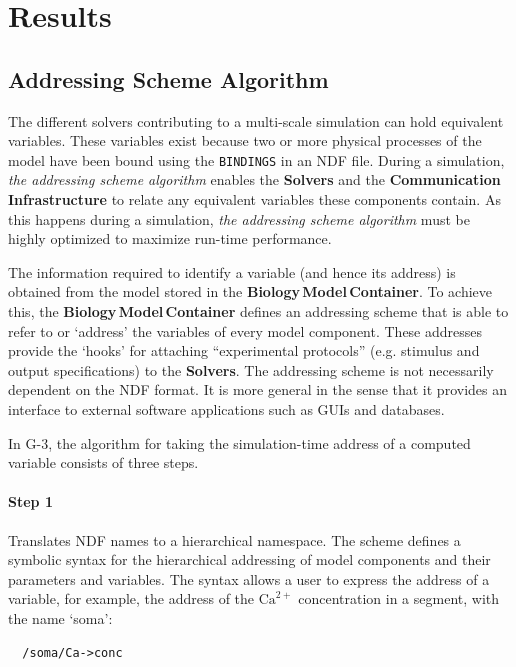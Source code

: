 \documentclass[11pt,3p,twocolumn]{JMN}
\begin{document}
\section{Results}

\subsection{Addressing Scheme Algorithm}

The different solvers contributing to a multi-scale simulation can hold equivalent variables.  These variables exist because two or more physical processes of the model have been bound using the {\tt BINDINGS} in an NDF file.  During a simulation, {\it the addressing scheme algorithm} enables the {\bf Solvers} and the {\bf Communication\,Infrastructure} to relate any equivalent variables these components contain.  As this happens during a simulation, {\it the addressing scheme algorithm} must be highly optimized to maximize run-time performance.

The information required to identify a variable (and hence its address) is obtained from the model stored in the {\bf Biology\,Model\,Container}. To achieve this, the {\bf Biology\,Model\,Container} defines an addressing scheme that is able to refer to or `address' the variables of every model component. These addresses provide the `hooks' for attaching ``experimental protocols'' (e.g. stimulus and output specifications) to the {\bf Solvers}.  The addressing scheme is not necessarily dependent on the NDF format. It is more general in the sense that it provides an interface to external software applications such as GUIs and databases.

In G-3, the algorithm for taking the simulation-time address of a computed variable consists of three steps.

\paragraph{Step 1} Translates NDF names to a hierarchical namespace. The scheme defines a symbolic syntax for the hierarchical addressing of model components and their parameters and variables.  The syntax allows a user to express the address of a variable, for example, the address of the $\mathrm{Ca}^{2+}$ concentration in a segment, with the name `soma':

\begin{tiny}
\begin{verbatim}
  /soma/Ca->conc
\end{verbatim}
\end{tiny}
\end{document}
